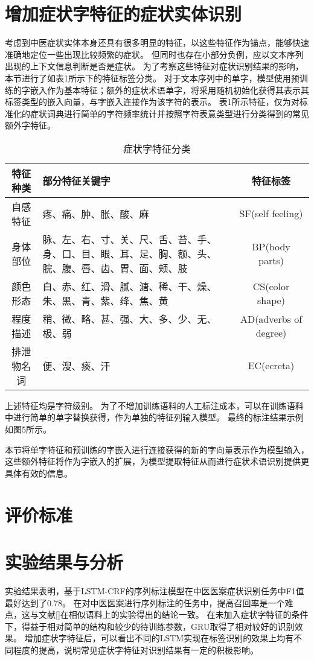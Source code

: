 \section{增加症状字特征的症状实体识别}
考虑到中医症状实体本身还具有很多明显的特征，以这些特征作为锚点，能够快速准确地定位一些出现比较频繁的症状。
但同时也存在小部分负例，应以文本序列出现的上下文信息判断是否是症状。
为了考察这些特征对症状识别结果的影响，本节进行了如表1所示下的特征标签分类。
对于文本序列中的单字，模型使用预训练的字嵌入作为基本特征；额外的症状术语单字，将采用随机初始化获得其表示其标签类型的嵌入向量，与字嵌入连接作为该字符的表示。
表1所示特征，仅为对标准化的症状词典进行简单的字符频率统计并按照字符表意类型进行分类得到的常见额外字特征。
\begin{table}[!htbp]
    \centering
    \footnotesize
    \setlength{\tabcolsep}{4pt}
    \renewcommand{\arraystretch}{1.2}
    \begin{tabular}{cp{7cm}c}
        \hline\hline
        特征种类 & 部分特征关键字 & 特征标签\\
        \hline
        自感特征 & 疼、痛、肿、胀、酸、麻 & SF(self feeling)\\
        \hline
        身体部位 & 脉、左、右、寸、关、尺、舌、苔、手、身、口、目、眼、耳、足、胸、额、头、脘、腹、唇、齿、胃、面、颊、肢 & BP(body parts)\\
        \hline
        颜色形态 & 白、赤、红、滑、腻、溏、稀、干、燥、朱、黑、青、紫、绛、焦、黄 & CS(color shape)\\
        \hline
        程度描述 & 稍、微、略、甚、强、大、多、少、无、极、弱 & AD(adverbs of degree) \\
        \hline
        排泄物名词 & 便、溲、痰、汗 & EC(ecreta)\\
        \hline\hline
    \end{tabular}
    \caption{症状字特征分类}
\end{table}

上述特征均是字符级别。
为了不增加训练语料的人工标注成本，可以在训练语料中进行简单的单字替换获得，作为单独的特征列输入模型。
最终的标注结果示例如图5所示。

本节将单字特征和预训练的字嵌入进行连接获得的新的字向量表示作为模型输入，这些额外特征将作为字嵌入的扩展，为模型提取特征从而进行症状术语识别提供更具体有效的信息。


\section{评价标准}
\section{实验结果与分析}
实验结果表明，基于LSTM-CRF的序列标注模型在中医医案症状识别任务中F1值最好达到了0.78。
在对中医医案进行序列标注的任务中，提高召回率是一个难点，这与文献[]在相似语料上的实验得出的结论一致。
在未加入症状字特征的条件下，得益于相对简单的结构和较少的待训练参数，GRU取得了相对较好的识别效果。
增加症状字特征后，可以看出不同的LSTM实现在标签识别的效果上均有不同程度的提高，说明常见症状字特征对识别结果有一定的积极影响。

